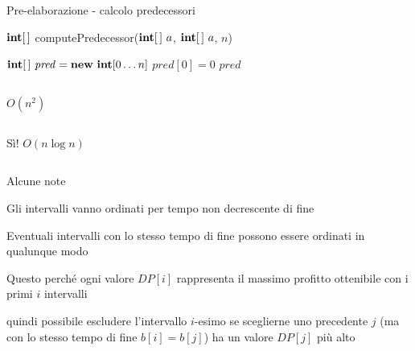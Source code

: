 \begin{frame}{Pre-elaborazione - calcolo predecessori}

\vspace{-6pt}
\begin{Procedure}
\caption[A]{$\INTEGER[\,]$ \textsf{computePredecessor($\INTEGER[\,]\ a$, $\INTEGER[\,]\ a$, \INTEGER $n$)}}    
$\INTARRAY\ \mathit{pred} = \NEW\ \INTEGER[0 \ldots n]$\;
$\mathit{pred}[0] = 0$\;
\Return $\mathit{pred}$\;
\end{Procedure}

\vspace{-6pt}
\begin{columns}[T]
\pause
{}
\bigskip\smallskip
$O(n^2)$
\end{columns}

\begin{columns}[T]
\pause
{}
\bigskip\smallskip
Sì! $O(n \log n)$
\end{columns}

\end{frame}

\begin{frame}{Alcune note}
    
\BIL
\item Gli intervalli vanno ordinati per tempo non decrescente di fine
\item Eventuali intervalli con lo stesso tempo di fine possono essere ordinati in qualunque modo
\item Questo perché ogni valore $DP[i]$ rappresenta il massimo profitto ottenibile con i primi $i$ intervalli
\item \EE quindi possibile escludere l'intervallo $i$-esimo se sceglierne uno precedente $j$ (ma con lo stesso tempo di fine $b[i]=b[j]$) ha un valore $DP[j]$ più alto
\EIL

\end{frame}


